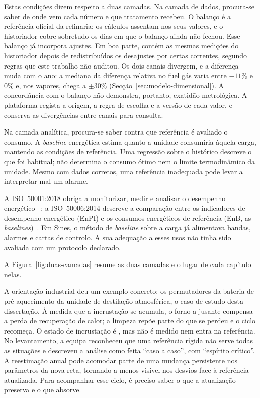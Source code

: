 Estas condições dizem respeito a duas camadas. Na camada de dados,
procura-se saber de onde vem cada número e que tratamento recebeu.
O balanço é a referência oficial da refinaria: os cálculos assentam nos
seus valores, e o historiador cobre sobretudo os dias em que o balanço
ainda não fechou. Esse balanço já incorpora ajustes. Em boa parte,
contém as mesmas medições do historiador depois de redistribuídos os
desajustes por certas correntes, segundo regras que este trabalho não
auditou. Os dois canais divergem, e a diferença muda com o ano: a mediana
da diferença relativa no fuel gás varia entre $-11\%$ e $0\%$ e, nos
vapores, chega a $\pm30\%$ (Secção~\ref{sec:modelo-dimensional}).
A concordância com o balanço não demonstra, portanto, exatidão metrológica.
A plataforma regista a origem, a regra de escolha e a versão de cada
valor, e conserva as divergências entre canais para consulta.

Na camada analítica, procura-se saber contra que referência é avaliado
o consumo. A \emph{baseline} energética estima quanto a unidade
consumiria àquela carga, mantendo as condições de referência. Uma
regressão sobre o histórico descreve o que foi habitual; não determina
o consumo ótimo nem o limite termodinâmico da unidade. Mesmo com dados
corretos, uma referência inadequada pode levar a interpretar mal um
alarme.

A ISO~50001:2018 obriga a monitorizar, medir e analisar o desempenho
energético ~\cite[\S9.1]{ISO50001_2018}; a ISO~50006:2014 descreve a
comparação entre os indicadores de desempenho energético (EnPI) e os
consumos energéticos de referência (EnB, as
\emph{baselines})~\cite{ISO50006_2014}. Em Sines, o método de
\emph{baseline} sobre a carga já alimentava bandas, alarmes e cartas
de controlo. A sua adequação a esses usos não tinha sido avaliada com
um protocolo declarado.

A Figura~\ref{fig:duas-camadas} resume as duas camadas e o lugar de cada capítulo nelas.



A orientação industrial deu um exemplo concreto: os permutadores da
bateria de pré-aquecimento da unidade de destilação atmosférica, o caso
de estudo desta dissertação. À medida que a incrustação se acumula, o
forno a jusante compensa a perda de recuperação de calor; a limpeza
repõe parte do que se perdeu e o ciclo recomeça. O estado de incrustação é , mas não é medido
nem entra na referência. No levantamento, a equipa reconheceu que uma referência
rígida não serve todas as situações e descreveu a análise como feita
\enquote{caso a caso}, com \enquote{espírito crítico}.
A reestimação anual pode acomodar parte de uma mudança persistente nos
parâmetros da nova reta, tornando-a menos visível nos desvios face à
referência atualizada. Para acompanhar esse ciclo, é preciso saber o que a atualização preserva
e o que absorve. 

